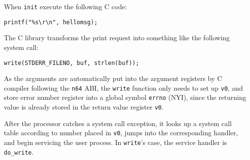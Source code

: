 \documentclass{report}
\def \hilite#1{\textcolor{red}{#1}}
\newenvironment{hilight}{\color{red}}{\color{black}}
\begin{document}
\begin{hilight}
		When \texttt{init} execute the following C code:
		\begin{lstlisting}[style=c]
		printf("%s\r\n", hellomsg);
		\end{lstlisting}
		The C library transforms the print request into something like the following system call:
		\begin{lstlisting}[style=c]
		write(STDERR_FILENO, buf, strlen(buf));
		\end{lstlisting}
		As the arguments are automatically put into the argument registers by C compiler following
		the \texttt{n64} ABI, the \texttt{write}
		function only needs to set up \texttt{v0}, and store
		error number register into a global symbol \texttt{errno} (NYI), since the returning value is already
		stored in the return value register \texttt{v0}.
		
		After the processor catches a system call exception,
		it looks up a system call table according
		to number placed in \texttt{v0}, jumps into the corresponding handler, and begin servicing the
		user process.
		In \texttt{write}'s case, the service handler is \texttt{do\_write}.
		\marginpar{
			\footnotesize\ttfamily
			\hilite{fs/write.c}
		}
	\end{hilight}
	
\end{document}
